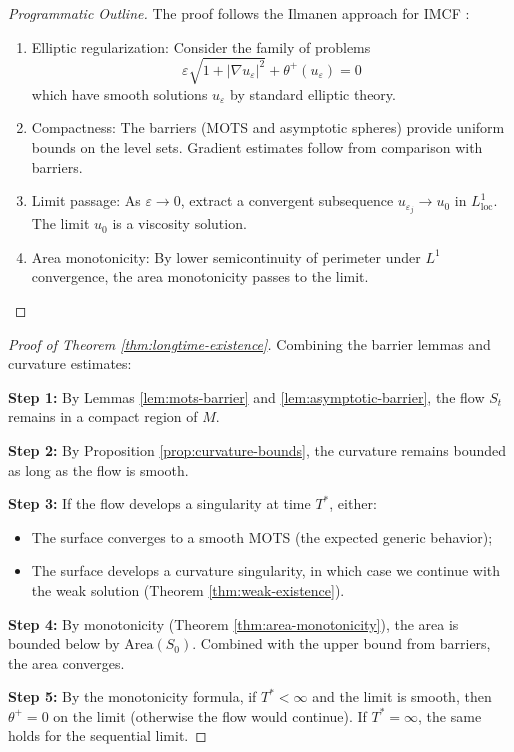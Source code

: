 \begin{proof}[Programmatic Outline]
The proof follows the Ilmanen approach for IMCF \cite{ilmanen2001}:
\begin{enumerate}
\item Elliptic regularization: Consider the family of problems
\begin{equation}
\varepsilon \sqrt{1 + |\nabla u_\varepsilon|^2} + \theta^+(u_\varepsilon) = 0
\end{equation}
which have smooth solutions $u_\varepsilon$ by standard elliptic theory.

\item Compactness: The barriers (MOTS and asymptotic spheres) provide uniform bounds on the level sets. Gradient estimates follow from comparison with barriers.

\item Limit passage: As $\varepsilon \to 0$, extract a convergent subsequence $u_{\varepsilon_j} \to u_0$ in $L^1_{\mathrm{loc}}$. The limit $u_0$ is a viscosity solution.

\item Area monotonicity: By lower semicontinuity of perimeter under $L^1$ convergence, the area monotonicity passes to the limit.
\end{enumerate}
\end{proof}

\begin{proof}[Proof of Theorem \ref{thm:longtime-existence}]
Combining the barrier lemmas and curvature estimates:

\textbf{Step 1:} By Lemmas \ref{lem:mots-barrier} and \ref{lem:asymptotic-barrier}, the flow $S_t$ remains in a compact region of $M$.

\textbf{Step 2:} By Proposition \ref{prop:curvature-bounds}, the curvature remains bounded as long as the flow is smooth.

\textbf{Step 3:} If the flow develops a singularity at time $T^*$, either:
\begin{itemize}
\item The surface converges to a smooth MOTS (the expected generic behavior);
\item The surface develops a curvature singularity, in which case we continue with the weak solution (Theorem \ref{thm:weak-existence}).
\end{itemize}

\textbf{Step 4:} By monotonicity (Theorem \ref{thm:area-monotonicity}), the area is bounded below by $\mathrm{Area}(S_0)$. Combined with the upper bound from barriers, the area converges.

\textbf{Step 5:} By the monotonicity formula, if $T^* < \infty$ and the limit is smooth, then $\theta^+ = 0$ on the limit (otherwise the flow would continue). If $T^* = \infty$, the same holds for the sequential limit.
\end{proof}


